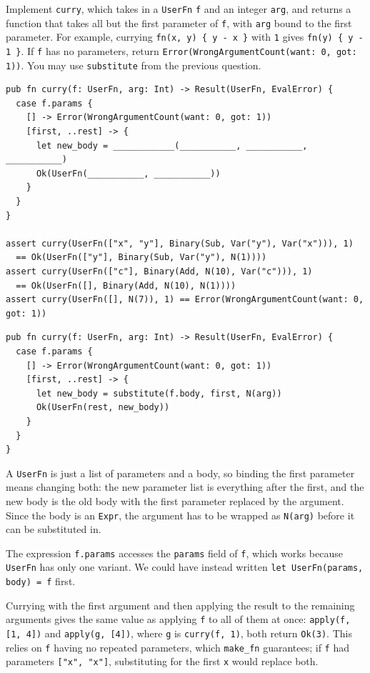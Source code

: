 \begin{blocksection}
\question Implement \texttt{curry}, which takes in a \lstinline{UserFn} \texttt{f} and an integer \texttt{arg}, and returns a function that takes all but the first parameter of \texttt{f}, with \texttt{arg} bound to the first parameter. For example, currying \lstinline|fn(x, y) { y - x }| with \texttt{1} gives \lstinline|fn(y) { y - 1 }|. If \texttt{f} has no parameters, return \lstinline{Error(WrongArgumentCount(want: 0, got: 1))}. You may use \texttt{substitute} from the previous question.
\begin{lstlisting}
pub fn curry(f: UserFn, arg: Int) -> Result(UserFn, EvalError) {
  case f.params {
    [] -> Error(WrongArgumentCount(want: 0, got: 1))
    [first, ..rest] -> {
      let new_body = ____________(___________, ___________, ___________)
      Ok(UserFn(___________, ___________))
    }
  }
}

assert curry(UserFn(["x", "y"], Binary(Sub, Var("y"), Var("x"))), 1)
  == Ok(UserFn(["y"], Binary(Sub, Var("y"), N(1))))
assert curry(UserFn(["c"], Binary(Add, N(10), Var("c"))), 1)
  == Ok(UserFn([], Binary(Add, N(10), N(1))))
assert curry(UserFn([], N(7)), 1) == Error(WrongArgumentCount(want: 0, got: 1))
\end{lstlisting}

\begin{solution}
\begin{lstlisting}
pub fn curry(f: UserFn, arg: Int) -> Result(UserFn, EvalError) {
  case f.params {
    [] -> Error(WrongArgumentCount(want: 0, got: 1))
    [first, ..rest] -> {
      let new_body = substitute(f.body, first, N(arg))
      Ok(UserFn(rest, new_body))
    }
  }
}
\end{lstlisting}
\end{solution}

\begin{questionmeta}
  A \lstinline{UserFn} is just a list of parameters and a body, so binding the first parameter means changing both: the new parameter list is everything after the first, and the new body is the old body with the first parameter replaced by the argument. Since the body is an \lstinline{Expr}, the argument has to be wrapped as \lstinline{N(arg)} before it can be substituted in.

  The expression \lstinline{f.params} accesses the \texttt{params} field of \texttt{f}, which works because \lstinline{UserFn} has only one variant. We could have instead written \lstinline{let UserFn(params, body) = f} first.

  Currying with the first argument and then applying the result to the remaining arguments gives the same value as applying \texttt{f} to all of them at once: \lstinline{apply(f, [1, 4])} and \lstinline{apply(g, [4])}, where \texttt{g} is \lstinline{curry(f, 1)}, both return \lstinline{Ok(3)}. This relies on \texttt{f} having no repeated parameters, which \lstinline{make_fn} guarantees; if \texttt{f} had parameters \lstinline{["x", "x"]}, substituting for the first \texttt{x} would replace both.
\end{questionmeta}
\end{blocksection}